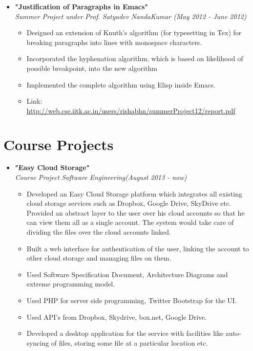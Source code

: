 \documentclass[margin,line]{resume}
\begin{document}
\begin{resume}
\begin{itemize}
  \item \large{\textbf{\textsf{"Justification of Paragraphs in Emacs"}}}
    \\ \small{\textit{Summer Project under Prof. Satyadev NandaKumar (May 2012 - June 2012)}}
    \normalsize
    \begin{itemize}
    \item Designed an extension of Knuth's algorithm (for typesetting in Tex) for breaking paragraphs into lines with monospace characters.
    \item Incorporated the hyphenation algorithm, which is based on likelihood of possible breakpoint, into the new algorithm
    \item Implemented the complete algorithm using Elisp inside Emacs.
    \item Link: \url{http://web.cse.iitk.ac.in/users/rishabhn/summerProject12/report.pdf}
    \end{itemize}
    
  \end{itemize}

  \newpage
  \section{\mysidestyle Course Projects}

  \begin{itemize}

  \item \large{\textbf{\textsf{"Easy Cloud Storage"}}}
    \\ \small{\textit{Course Project Software Engineering(August 2013 - now)}}
    \normalsize
    \begin{itemize}
    \item Developed an Easy Cloud Storage platform which integrates all existing cloud storage services such as Dropbox, Google Drive, SkyDrive etc. Provided an abstract layer to the user over his cloud accounts so that he can view them all as a single account. The system would take care of dividing the files over the cloud accounts linked.
    \item Built a web interface for authentication of the user, linking the account to other cloud storage and managing files on them.
    \item Used Software Specification Document, Architecture Diagrams and extreme programming model.
    \item Used PHP for server side programming, Twitter Bootstrap for the UI.
    \item Used API's from Dropbox, Skydrive, box.net, Google Drive.
    \item Developed a desktop application for the service with facilities like auto-syncing of files, storing some file at a particular location etc.
    \end{itemize}


\end{itemize}
\end{resume}
\end{document}
